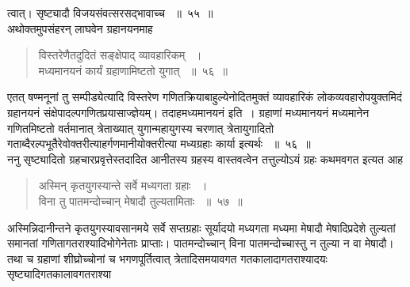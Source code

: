 \documentclass[11pt, openany]{book}
\begin{document}
\begin{sloppypar}
\noindent त्वात्। सृष्ट्यादौ विजयसंवत्सरसद्भावाच्च ~॥~५५~॥\\ 
\noindent अथोक्तमुपसंहरन् लाघवेन ग्रहानयनमाह\textendash
\end{sloppypar}
\begin{quote}

  {\ssi विस्तरेणैतदुदितं सङ्क्षेपाद् व्यावहारिकम् ~।\\
मध्यमानयनं कार्यं ग्रहाणामिष्टतो युगात् ~॥~५६~॥}
\end{quote}
\begin{sloppypar}
 एतत् षण्मनूनां तु सम्पीड्येत्यादि विस्तरेण गणितक्रियाबाहुल्येनोदितमुक्तं व्यावहारिकं लोकव्यवहारोपयुक्तमिदं ग्रहानयनं संक्षेपादल्पगणितप्रयासाज्ज्ञेयम्। तदाह\textendash मध्यमानयनं इति~।  ग्रहाणां मध्यमानयनं मध्यमानेन गणितमिष्टतो वर्तमानात् त्रेताख्यात् युगान्महायुगस्य चरणात् त्रेतायुगादितो गताब्दैरल्पभूतैरेवोक्तरीत्याहर्गणमानीयोक्तरीत्या मध्यग्रहाः कार्या इत्यर्थः ~॥~५६~॥\\
 \noindent ननु सृष्ट्यादितो ग्रहचारप्रवृत्तेस्तदादित आनीतस्य ग्रहस्य वास्तवत्वेन तत्तुल्योऽयं ग्रहः कथमवगत इत्यत आह\textendash
\end{sloppypar}
\begin{quote}

  {\ssi अस्मिन् कृतयुगस्यान्ते सर्वे मध्यगता ग्रहाः ~।\\
विना तु पातमन्दोच्चान् मेषादौ तुल्यतामिताः ~॥~५७~॥}
\end{quote}
\begin{sloppypar}
अस्मिन्निदानीन्तने कृतयुगस्यावसानमये सर्वे सप्तग्रहाः सूर्यादयो मध्यगता मध्यमा मेषादौ मेषादिप्रदेशे तुल्यतां समानतां गणितागतराश्यादिभोगेनेताः प्राप्ताः। पातमन्दोच्चान्  विना पातमन्दोच्चास्तु न तुल्या न वा मेषादौ। तथा च ग्रहाणां शीघ्रोच्चोनां च भगणपूर्तित्वात् त्रेतादिसमयावगत गतकालादागतराश्यादयः सृष्ट्यादिगतकालावगतराश्या\textendash
\end{sloppypar}

\newpage 
\end{document}
